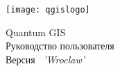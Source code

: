 
\begin{titlepage}
\begin{center}

\begin{center}
\texttt{[image: qgislogo]}
\end{center}

\Huge{Quantum GIS}\\
\vspace{0.5cm}
\Large{Руководство пользователя} \\
\vspace{0.5cm}
\Large{Версия ~\CURRENT \textsl{'Wroclaw'}}

\end{center}
\end{titlepage}
